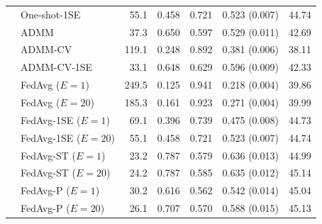 \begin{longtable}{llrrrrr}
 & One-shot-1SE & 55.1 & 0.458 & 0.721 & 0.523 (0.007) & 44.74 \\
 & ADMM & 37.3 & 0.650 & 0.597 & 0.529 (0.011) & 42.69 \\
 & ADMM-CV & 119.1 & 0.248 & 0.892 & 0.381 (0.006) & 38.11 \\
 & ADMM-CV-1SE & 33.1 & 0.648 & 0.629 & 0.596 (0.009) & 42.33 \\
 & FedAvg ($E=1$) & 249.5 & 0.125 & 0.941 & 0.218 (0.004) & 39.86 \\
 & FedAvg ($E=20$) & 185.3 & 0.161 & 0.923 & 0.271 (0.004) & 39.99 \\
 & FedAvg-1SE ($E=1$) & 69.1 & 0.396 & 0.739 & 0.475 (0.008) & 44.73 \\
 & FedAvg-1SE ($E=20$) & 55.1 & 0.458 & 0.721 & 0.523 (0.007) & 44.74 \\
 & FedAvg-ST ($E=1$) & 23.2 & 0.787 & 0.579 & 0.636 (0.013) & 44.99 \\
 & FedAvg-ST ($E=20$) & 24.2 & 0.787 & 0.585 & 0.635 (0.012) & 45.14 \\
 & FedAvg-P ($E=1$) & 30.2 & 0.616 & 0.562 & 0.542 (0.014) & 45.04 \\
 & FedAvg-P ($E=20$) & 26.1 & 0.707 & 0.570 & 0.588 (0.015) & 45.13 \\
\end{longtable}\endgroup
